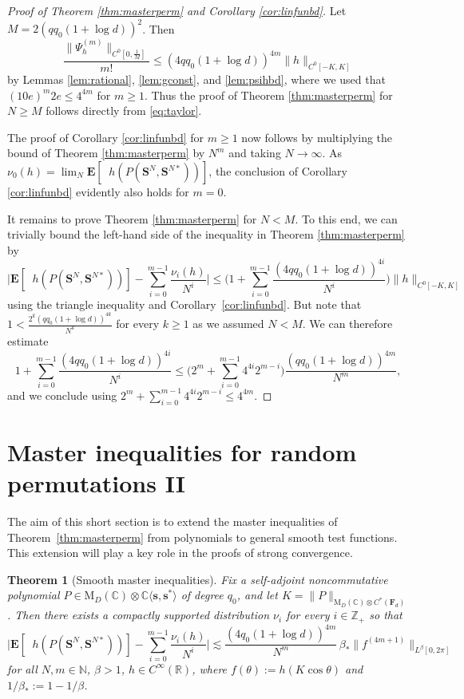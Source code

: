 \documentclass[10pt,reqno]{amsart}
\newtheorem{thm}{Theorem}[section]
\theoremstyle{definition}
\theoremstyle{remark}
\numberwithin{equation}{section}
\numberwithin{figure}{section}
\numberwithin{table}{section}
\newcommand{\ntrND}{\mathop{\mathrm{tr}_{DN}}}
\newcommand{\EE}{\mathbf{E}}
\begin{document}
\begin{proof}[Proof of Theorem \ref{thm:masterperm} and Corollary 
\ref{cor:linfunbd}]
Let $M= 2(qq_0(1+\log d))^2$. Then
$$
	\frac{\|\Psi_h^{(m)}\|_{C^0[0,\frac{1}{M}]}}{m!}
	\le (4qq_0(1+\log d))^{4m} 
	\|h\|_{C^0[-K,K]}
$$
by Lemmas \ref{lem:rational}, \ref{lem:gconst}, and \ref{lem:psihbd},
where we used that $(10e)^m 2e \le 4^{4m}$ for $m\ge 1$. Thus the proof of 
Theorem \ref{thm:masterperm} for $N\ge M$ follows directly from
\eqref{eq:taylor}. 

The proof of Corollary \ref{cor:linfunbd} for $m\ge 1$ now follows by 
multiplying the bound of Theorem \ref{thm:masterperm} by $N^m$ and taking 
$N\to\infty$. As $\nu_0(h)=\lim_{N} \EE[ \ntrND 
h(P(\boldsymbol{S}^N,\boldsymbol{S}^{N*}))]$, the conclusion of 
Corollary \ref{cor:linfunbd} evidently also holds for $m=0$.

It remains to prove Theorem \ref{thm:masterperm} for $N<M$. To this end,
we can trivially bound the left-hand side of the inequality in
Theorem \ref{thm:masterperm} by
$$
	\bigg|\EE[
	\ntrND h(P(\boldsymbol{S}^N,\boldsymbol{S}^{N*}))]
	- \sum_{i=0}^{m-1} \frac{\nu_i(h)}{N^i}
	\bigg|
	\le
	\bigg(
	1
	+ \sum_{i=0}^{m-1} \frac{(4qq_0(1+\log d))^{4i}}{N^i}
	\bigg)
	\|h\|_{C^0[-K,K]}
$$
using the triangle inequality and Corollary~\ref{cor:linfunbd}.
But note that $1<\frac{2^k(qq_0(1+\log d))^{4k}}{N^k}$ for 
every $k\ge 1$ as we assumed $N<M$. We can therefore estimate
$$
	1
	+ \sum_{i=0}^{m-1} \frac{(4qq_0(1+\log d))^{4i}}{N^i}
	\le
	\bigg(
	2^m + \sum_{i=0}^{m-1} 4^{4i} 2^{m-i}
	\bigg)
	\frac{(qq_0(1+\log d))^{4m}}{N^m},
$$
and we conclude using
$2^m + \sum_{i=0}^{m-1} 4^{4i} 2^{m-i}\le 4^{4m}$.
\end{proof}


\section{Master inequalities for random permutations II}
\label{sec:masterII}

The aim of this short section is to extend the master inequalities of 
Theorem~\ref{thm:masterperm} from polynomials to general smooth test 
functions. This extension will play a key role in the proofs of strong 
convergence.

\begin{thm}[Smooth master inequalities]
\label{thm:smmasterperm}
Fix a self-adjoint noncommutative polynomial $P\in
\mathrm{M}_D(\mathbb{C})\otimes\mathbb{C}\langle
\boldsymbol{s},\boldsymbol{s}^*\rangle$ of degree $q_0$, and let
$K=\|P\|_{\mathrm{M}_D(\mathbb{C})\otimes C^*(\mathbf{F}_d)}$.
Then there exists a compactly supported
distribution $\nu_i$ for every $i\in\mathbb{Z}_+$ so that
$$
	\bigg|\EE[
	\ntrND h(P(\boldsymbol{S}^N,\boldsymbol{S}^{N*}))]
	- \sum_{i=0}^{m-1} \frac{\nu_i(h)}{N^i}
	\bigg|
	\lesssim
	\frac{(4q_0(1+\log d))^{4m}}{N^m} 
	\,\beta_*\|f^{(4m+1)}\|_{L^\beta[0,2\pi]}
$$
for all $N,m\in\mathbb{N}$, $\beta>1$, $h\in C^\infty(\mathbb{R})$,
where $f(\theta):=h(K\cos\theta)$ and $1/\beta_*:=1-1/\beta$.
\end{thm}
\end{document}

